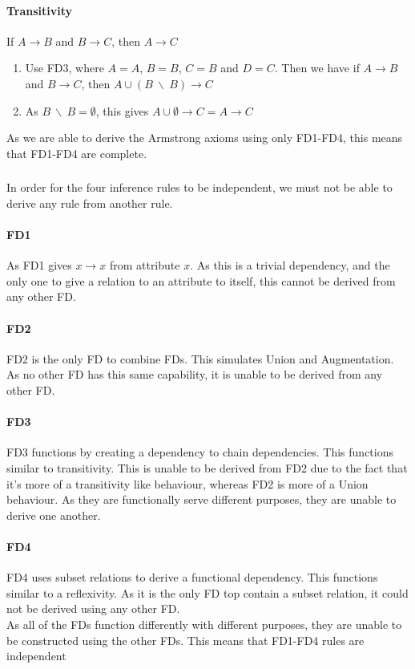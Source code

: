 \documentclass[letterpaper]{article}
\theoremstyle{plain}
\theoremstyle{definition}
\theoremstyle{remark}
\begin{document}
\paragraph{Transitivity}
\begin{center}
    If $A\rightarrow B$ and $B\rightarrow C$, then $A\rightarrow C$
\end{center}
\begin{enumerate}
    \item Use FD3, where $A=A$, $B=B$, $C=B$ and $D=C$. Then we have if $A\rightarrow B$ and $B\rightarrow C$, then $A\cup(B~\backslash~B)\rightarrow C$
    \item As $B~\backslash~B=\emptyset$, this gives $A\cup\emptyset\rightarrow C=A\rightarrow C$
\end{enumerate}
As we are able to derive the Armstrong axioms using only FD1-FD4, this means that FD1-FD4 are complete.

\newpage

\subsubsection{}
In order for the four inference rules to be independent, we must not be able to derive any rule from another rule.
\paragraph{FD1}
As FD1 gives $x\rightarrow x$ from attribute $x$. As this is a trivial dependency, and the only one to give a relation to an attribute to itself, this cannot be derived from any other FD.
\paragraph{FD2}
FD2 is the only FD to combine FDs. This simulates Union and Augmentation. As no other FD has this same capability, it is unable to be derived from any other FD.
\paragraph{FD3}
FD3 functions by creating a dependency to chain dependencies. This functions similar to transitivity. This is unable to be derived from FD2 due to the fact that it's more of a transitivity like behaviour, whereas FD2 is more of a Union behaviour. As they are functionally serve different purposes, they are unable to derive one another.
\paragraph{FD4}
FD4 uses subset relations to derive a functional dependency. This functions similar to a reflexivity. As it is the only FD top contain a subset relation, it could not be derived using any other FD.\\[1.5em]
As all of the FDs function differently with different purposes, they are unable to be constructed using the other FDs. This means that FD1-FD4 rules are independent
\end{document}
